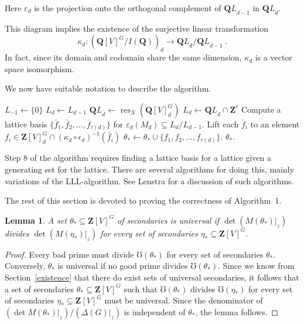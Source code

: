\documentclass[12pt]{amsart}
\DeclareMathOperator{\res}{res}
\newcommand{\QQ}{\mathbf{Q}} %
\newcommand{\ZZ}{\mathbf{Z}} %
\newcommand{\QQ}{\mathbb{Q}} %
\newcommand{\ZZ}{\mathbb{Z}} %
\newtheorem{lem}[thm]{Lemma}
\theoremstyle{definition}
\newcommand{\bth}{{{\theta_*}}} %
\newcommand{\QL}{{\QQ L}}
\begin{document}
Here $\varepsilon_d$ is the projection onto the orthogonal complement of $\QL_{d-1}$ in $\QL_d$.

  This diagram implies the existence of the surjective linear transformation
  $$\kappa_d : (\QQ[V]^G/I(\QQ))_d \longrightarrow \QL_d/\QL_{d-1}\ .$$
  In fact, since its domain and codomain share the same dimension, $\kappa_d$ is a vector space isomorphism.  


  We now have suitable notation to describe the algorithm.

\begin{algorithm}
\caption{Find Universal Secondaries}\label{algorithm}
\begin{algorithmic}[1]
 \State $L_{-1} \leftarrow \{0\}$
\State $L_d \leftarrow L_{d-1}$
\Else
\State $\QL_d \leftarrow \res_X(\QQ[V]_d^G)$
\State $L_{d} \leftarrow \QL_d \cap \ZZ^\ell$
\State Compute a lattice basis $\{\bar{f}_1,\bar{f}_2,\dots,\bar{f}_{\tau(d)}\}$ 
for $\varepsilon_d(M_d) \subseteq L_d/L_{d-1}$.
\State Lift each $\bar{f}_i$ to an element
$f_i \in \ZZ[V]_d^G \cap (\kappa_d\circ\epsilon_d)^{-1}(\bar{f}_i)$
\State $\bth \leftarrow \bth \cup \{f_1,f_2,\dots,f_{\tau(d)}\}$.
\EndIf
\EndFor
\Return $\bth$.
\end{algorithmic}
\end{algorithm}

Step 8 of the algorithm requires finding a lattice basis for a lattice given a
generating set for the lattice.  
There are several algorithms for doing this, mainly variations of the LLL-algorithm. 
See Lenstra \cite[Section~14]{L} for a discussion of such algorithms.


The rest of this section is devoted to proving the correctness of Algorithm~1.

\begin{lem}\label{lem: division minimum}
    A set $\bth \subseteq \ZZ[V]^G$ of  secondaries is universal if
    $\det(M(\bth)\vert_z)$ divides $\det(M(\eta_*)\vert_z)$
    for every set of secondaries 
    $\eta_* \subseteq \ZZ[V]^G$. 
\end{lem}
\begin{proof}
Every bad prime must divide $\mho(\bth)$ for every set of secondaries $\bth$.
Conversely, $\bth$ is universal if no good prime divides $\mho(\bth)$.
Since we know from Section~\ref{existence} that there do exist sets of universal secondaries, it follows that
a set of secondaries $\bth \subseteq \ZZ[V]^G$ such that 
    $\mho(\bth)$ divides $\mho(\eta_*)$
    for every set of secondaries 
    $\eta_* \subseteq \ZZ[V]^G$ must be universal. 
Since the denominator of $(\det M(\bth)\vert_z)/(\Delta(G)\vert_z)$ is independent of $\bth$, the lemma follows.
\end{proof}
\end{document}
